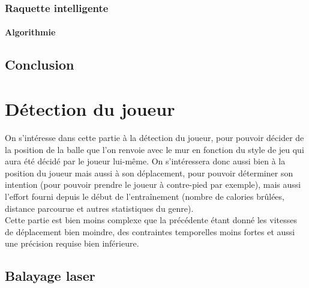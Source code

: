 \subsection{Raquette intelligente}

\subsubsection{Algorithmie}











\section{Conclusion}






















\chapter{Détection du joueur}

On s'intéresse dans cette partie à la détection du joueur, pour pouvoir décider de la position de la balle que l'on renvoie avec le mur en fonction du style de jeu qui aura été décidé par le joueur lui-même. On s'intéressera donc aussi bien à la position du joueur mais aussi à son déplacement, pour pouvoir déterminer son intention (pour pouvoir prendre le joueur à contre-pied par exemple), mais aussi l'effort fourni depuis le début de l'entraînement (nombre de calories brûlées, distance parcourue et autres statistiques du genre). \\

Cette partie est bien moins complexe que la précédente étant donné les vitesses de déplacement bien moindre, des contraintes temporelles moins fortes et aussi une précision requise bien inférieure.


\section{Balayage laser}


